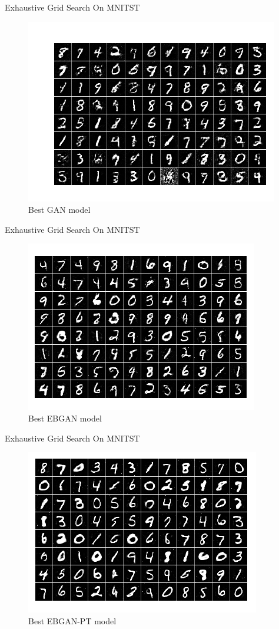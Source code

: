 \documentclass[mathserif]{beamer}
\begin{document}
\begin{frame}{Exhaustive Grid Search On MNITST}
\begin{figure}
  \centering
  \includegraphics[scale=1]{fig/5.png}
  \caption{Best GAN model}
  \label{}
\end{figure}
\end{frame}
\begin{frame}{Exhaustive Grid Search On MNITST}
\begin{figure}
  \centering
  \includegraphics[scale=1]{fig/6.png}
  \caption{Best EBGAN model}
  \label{}
\end{figure}
\end{frame}\begin{frame}{Exhaustive Grid Search On MNITST}
\begin{figure}
  \centering
  \includegraphics[scale=1]{fig/7.png}
  \caption{Best EBGAN-PT model}
  \label{}
\end{figure}
\end{frame}
\end{document}
